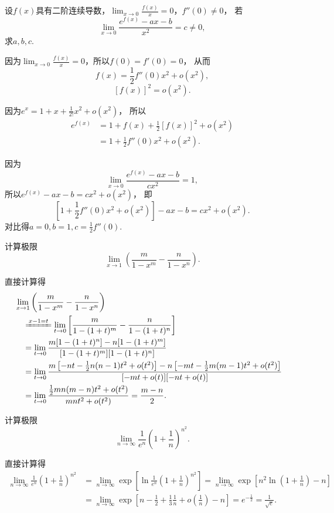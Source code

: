 \begin{example}
\def\l{\lim_{x\to0}}
设\(f(x)\)具有二阶连续导数，\(\l \frac{f(x)}{x} = 0\)，\(f''(0)\neq0\)，
若\[
	\l \frac{e^{f(x)}-ax-b}{x^2} = c \neq 0,
\]
求\(a,b,c\).
\begin{solution}
因为\(\l \frac{f(x)}{x} = 0\)，所以\(f(0) = f'(0) = 0\)，
从而\[
	f(x) = \frac{1}{2} f''(0) x^2 + o(x^2),
\]\[
	[f(x)]^2 = o(x^2).
\]

因为\(e^x = 1 + x + \frac{1}{2!} x^2 + o(x^2)\)，
所以\begin{align*}
	e^{f(x)} &= 1 + f(x) + \frac{1}{2} [f(x)]^2 + o(x^2) \\
	&= 1 + \frac{1}{2} f''(0) x^2 + o(x^2).
\end{align*}

因为\[
	\l \frac{e^{f(x)} - ax - b}{c x^2} = 1,
\]
所以\(e^{f(x)} - ax - b = c x^2 + o(x^2)\)，
即\[
	\left[ 1 + \frac{1}{2} f''(0) x^2 + o(x^2) \right] - ax - b = c x^2 + o(x^2).
\]
对比得\(a = 0, b = 1, c = \frac{1}{2} f''(0)\).
\end{solution}
\end{example}

\begin{example}
计算极限\[
	\lim_{x\to1} \left(\frac{m}{1-x^m} - \frac{n}{1-x^n}\right).
\]
\begin{solution}
直接计算得
\begin{align*}
	&\hspace{-10pt}
	\lim_{x\to1} \left(\frac{m}{1-x^m} - \frac{n}{1-x^n}\right) \\
	&\xlongequal{x-1=t}
	\lim_{t\to0} \left[\frac{m}{1-(1+t)^m}-\frac{n}{1-(1+t)^n}\right] \\
	&=
	\lim_{t\to0} \frac{m[1-(1+t)^n]-n[1-(1+t)^m]}{[1-(1+t)^m][1-(1+t)^n]} \\
	&=
	\lim_{t\to0} \frac{m\left[-nt-\frac{1}{2}n(n-1)t^2+o(t^2)\right]
		-n\left[-mt-\frac{1}{2}m(m-1)t^2+o(t^2)\right]}{[-mt+o(t)][-nt+o(t)]} \\
	&=
	\lim_{t\to0} \frac{\frac{1}{2}mn(m-n)t^2+o(t^2)}{mnt^2+o(t^2)}
	= \frac{m-n}{2}.
\end{align*}
\end{solution}
\end{example}

\begin{example}
计算极限\[
	\lim_{n\to\infty} \frac{1}{e^n} \left(1+\frac{1}{n}\right)^{n^2}.
\]
\begin{solution}
直接计算得\begin{align*}
	\lim_{n\to\infty} \frac{1}{e^n} \left(1+\frac{1}{n}\right)^{n^2}
	&= \lim_{n\to\infty} \exp[\ln\frac{1}{e^n} \left(1+\frac{1}{n}\right)^{n^2}]
	= \lim_{n\to\infty} \exp[ n^2 \ln(1+\frac{1}{n}) - n ] \\
	&= \lim_{n\to\infty} \exp[ n - \frac{1}{2} + \frac{1}{3} \frac{1}{n} + o\left(\frac{1}{n}\right) - n ]
	= e^{-\frac{1}{2}}
	= \frac{1}{\sqrt{e}}.
\end{align*}
\end{solution}
\end{example}

